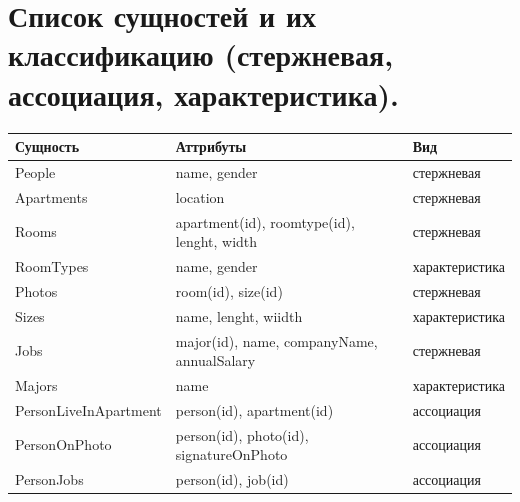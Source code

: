 \documentclass[12pt,onecolumn]{article}
\begin{document}
\section{Список сущностей и их классификацию (стержневая, ассоциация, характеристика).}
\begin{longtable}{|l|l|l|}
  \hline
  \textbf{Сущность}     & \textbf{Аттрибуты}                         & \textbf{Вид}   \\ \hline
  \endfirsthead
  \endhead
  People                & name, gender                               & стержневая     \\ \hline
  Apartments            & location                                   & стержневая     \\ \hline
  Rooms                 & apartment(id), roomtype(id), lenght, width & стержневая     \\ \hline
  RoomTypes             & name, gender                               & характеристика \\ \hline
  Photos                & room(id), size(id)                         & стержневая     \\ \hline
  Sizes                 & name, lenght, wiidth                       & характеристика \\ \hline
  Jobs                  & major(id), name, companyName, annualSalary & стержневая     \\ \hline
  Majors                & name                                       & характеристика \\ \hline
  PersonLiveInApartment & person(id), apartment(id)                  & ассоциация     \\ \hline
  PersonOnPhoto         & person(id), photo(id), signatureOnPhoto    & ассоциация     \\ \hline
  PersonJobs            & person(id), job(id)                        & ассоциация     \\ \hline
\end{longtable}
\end{document}
